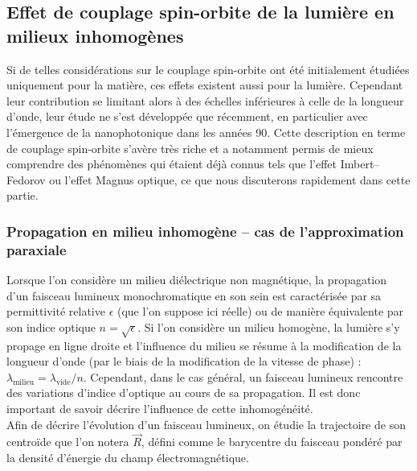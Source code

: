 \documentclass[a4paper,11pt]{article} %
\begin{document}
	\subsection{Effet de couplage spin-orbite de la lumière en milieux inhomogènes}
	Si de telles considérations sur le couplage spin-orbite ont été initialement étudiées uniquement pour la matière, ces effets existent aussi pour la lumière. Cependant leur contribution se limitant alors à des échelles inférieures à celle de la longueur d'onde, leur étude ne s'est développée que récemment, en particulier avec l'émergence de la nanophotonique dans les années 90. Cette description en terme de couplage spin-orbite s'avère très riche et a notamment permis de mieux comprendre des phénomènes qui étaient déjà connus tels que l'effet Imbert--Fedorov ou l'effet Magnus optique, ce que nous discuterons rapidement dans cette partie.
	
	\subsubsection{Propagation en milieu inhomogène -- cas de l'approximation paraxiale}
	Lorsque l'on considère un milieu diélectrique non magnétique, la propagation d'un faisceau lumineux monochromatique en son sein est caractérisée par sa permittivité relative $ \epsilon $ (que l'on suppose ici réelle) ou de manière équivalente par son indice optique $ n = \sqrt{\epsilon} $. Si l'on considère un milieu homogène, la lumière s'y propage en ligne droite et l'influence du milieu se résume à la modification de la longueur d'onde (par le biais de la modification de la vitesse de phase) : $ \lambda_\text{milieu} = \lambda_\text{vide} / n $. Cependant, dans le cas général, un faisceau lumineux rencontre des variations d'indice d'optique au cours de sa propagation. Il est donc important de savoir décrire l'influence de cette inhomogénéité.\\
	Afin de décrire l'évolution d'un faisceau lumineux, on étudie la trajectoire de son centroïde que l'on notera $ \vec{R} $, défini comme le barycentre du faisceau pondéré par la densité d'énergie du champ électromagnétique.\\
	
\end{document}
